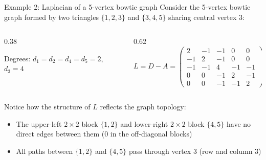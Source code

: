 \documentclass[aspectratio=169]{beamer}\usepackage[]{graphicx}\usepackage[]{xcolor}
\begin{document}
\begin{frame}{Example 2: Laplacian of a 5-vertex bowtie graph}
Consider the 5-vertex bowtie graph formed by two triangles $\{1, 2, 3\}$ and $\{3, 4, 5\}$ sharing central vertex $3$:
\vfill
\begin{columns}[c]
\begin{column}{0.38\textwidth}
\centering
{}
\vskip0.2cm
\footnotesize
Degrees: $d_1 = d_2 = d_4 = d_5 = 2$, $d_3 = 4$
\end{column}
\begin{column}{0.62\textwidth}
\[
L = D - A = \begin{pmatrix}
2 & -1 & -1 & 0 & 0 \\
-1 & 2 & -1 & 0 & 0 \\
-1 & -1 & 4 & -1 & -1 \\
0 & 0 & -1 & 2 & -1 \\
0 & 0 & -1 & -1 & 2
\end{pmatrix}
\]
\end{column}
\end{columns}
\vfill
Notice how the structure of $L$ reflects the graph topology:
\begin{itemize}
\item The upper-left $2\times 2$ block $\{1, 2\}$ and lower-right $2\times 2$ block $\{4, 5\}$ have no direct edges between them ($0$ in the off-diagonal blocks)
\item All paths between $\{1, 2\}$ and $\{4, 5\}$ pass through vertex $3$ (row and column $3$)
\end{itemize}
\end{frame}
\end{document}
